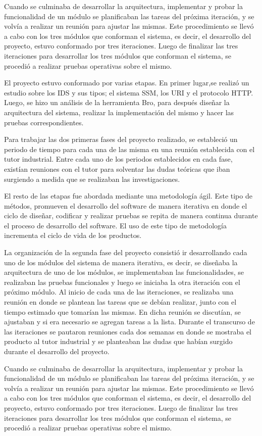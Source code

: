 Cuando se culminaba de desarrollar la arquitectura, implementar y probar la funcionalidad de un módulo se planificaban las tareas del próxima iteración, y se volvía a realizar un reunión para ajustar las mismas. Este procedimiento se llevó a cabo con los tres módulos que conforman el sistema, es decir, el desarrollo del proyecto, estuvo conformado por tres iteraciones. 
Luego de  finalizar las tres iteraciones para desarrollar los tres módulos que conforman el sistema, se procedió a realizar pruebas operativas sobre el mismo.

El proyecto estuvo conformado por varias etapas. En primer lugar,se realizó un estudio sobre los IDS y sus tipos; el sistema SSM, los URI y el protocolo HTTP. Luego, se hizo un análisis de la herramienta Bro, para después diseñar la arquitectura del sistema, realizar la implementación del mismo y hacer las pruebas correspondientes.

Para trabajar las dos primeras fases del proyecto realizado, se estableció un periodo de tiempo para cada una de las misma en una reunión establecida con el tutor industrial.
Entre cada uno de los periodos establecidos en cada fase, existían reuniones con el tutor para solventar las dudas teóricas que iban surgiendo a medida que se realizaban las investigaciones.

El resto de las etapas fue abordada mediante una metodología ágil. Este tipo de métodos,  promueven el desarrollo del software de manera iterativa en donde el ciclo de diseñar, codificar y realizar pruebas se repita de manera continua durante el proceso de desarrollo del software. El uso de este tipo de metodología incrementa el ciclo de vida de los productos.

La organización de la segunda fase del proyecto consistió ir desarrollando cada uno de los módulos del sistema de manera iterativa, es decir, se diseñaba la arquitectura de uno de los módulos, se implementaban las funcionalidades, se realizaban las pruebas funcionales y luego se iniciaba la otra iteración con el próximo módulo. Al inicio de cada una de las iteraciones, se realizaba una reunión en donde se plantean las tareas que se debían realizar, junto con el tiempo estimado que tomarían las mismas. En dicha reunión se discutían, se ajustaban y si era necesario se agregan tareas a la lista.  Durante el transcurso de las  iteraciones se pautaron reuniones cada dos semanas en donde se mostraba el producto al tutor industrial y se planteaban las dudas que habían surgido durante el desarrollo del proyecto.

Cuando se culminaba de desarrollar la arquitectura, implementar y probar la funcionalidad de un módulo se planificaban las tareas del próxima iteración, y se volvía a realizar un reunión para ajustar las mismas. Este procedimiento se llevó a cabo con los tres módulos que conforman el sistema, es decir, el desarrollo del proyecto, estuvo conformado por tres iteraciones. 
Luego de  finalizar las tres iteraciones para desarrollar los tres módulos que conforman el sistema, se procedió a realizar pruebas operativas sobre el mismo.
